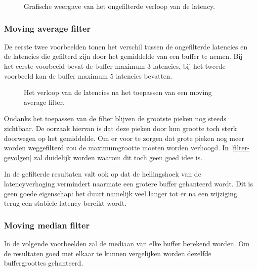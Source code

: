 

\begin{figure}[h!]
	\captionsetup{width=0.7\textwidth}
	\caption[Het ongefilterde verloop van de latency]{Grafische weergave van het ongefilterde verloop van de latency.}
	\begin{center}
		\advance\parskip0.3cm
	\end{center}
	\label{latencydata}
\end{figure}

\subsubsection{Moving average filter}

De eerste twee voorbeelden tonen het verschil tussen de ongefilterde latencies en de latencies die gefilterd zijn door het gemiddelde van een buffer te nemen. Bij het eerste voorbeeld bevat de buffer maximum 3 latencies, bij het tweede voorbeeld kan de buffer maximum 5 latencies bevatten.

\begin{figure}[!tbph]
	\centering
	\hfill
	\captionsetup{width=0.7\textwidth}
	\caption{Het verloop van de latencies na het toepassen van een moving average filter.}
\end{figure}

Ondanks het toepassen van de filter blijven de grootste pieken nog steeds zichtbaar. De oorzaak hiervan is dat deze pieken door hun grootte toch sterk doorwegen op het gemiddelde. Om er voor te zorgen dat grote pieken nog meer worden weggefilterd zou de maximumgrootte moeten worden verhoogd. In \ref{filter-gevolgen} zal duidelijk worden waarom dit toch geen goed idee is.

In de gefilterde resultaten valt ook op dat de hellingshoek van de latencyverhoging vermindert naarmate een grotere buffer gehanteerd wordt. Dit is geen goede eigenschap: het duurt namelijk veel langer tot er na een wijziging terug een stabiele latency bereikt wordt.

\subsubsection{Moving median filter}

In de volgende voorbeelden zal de mediaan van elke buffer berekend worden. Om de resultaten goed met elkaar te kunnen vergelijken worden dezelfde buffergroottes gehanteerd.

